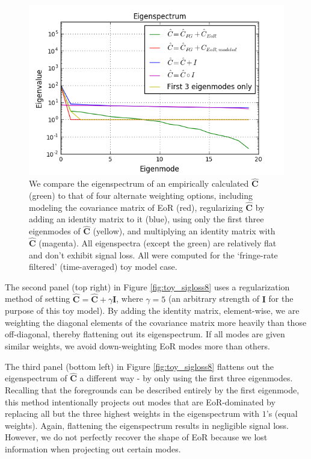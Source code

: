 \documentclass[preprint2,numberedappendix,tighten]{aastex6}  %
\begin{document}
\begin{figure}
	\centering
	\includegraphics[trim={0.3cm 0cm 0.3cm 0.3cm},clip,width=\columnwidth]{plots/toy_sigloss14.png}
	\caption{We compare the eigenspectrum of an empirically calculated $\hat{\textbf{C}}$ (green) to that of four alternate 
weighting options, including modeling the covariance matrix of EoR (red), regularizing $\hat{\textbf{C}}$ by adding an identity 
matrix to it (blue), using only the first three eigenmodes of $\hat{\textbf{C}}$ (yellow), and multiplying an identity matrix with $
\hat{\textbf{C}}$ (magenta). All eigenspectra (except the green) are relatively flat and don't exhibit signal loss. All were 
computed for the `fringe-rate filtered' (time-averaged) toy model case.}
	\label{fig:toy_sigloss14}
\end{figure}

The second panel (top right) in Figure \ref{fig:toy_sigloss8} uses a regularization method of setting $\hat{\textbf{C}} = 
\hat{\textbf{C}} + \gamma\textbf{I}$, where $\gamma = 5$ (an arbitrary strength 
of $\textbf{I}$ for the purpose of this toy model). By adding the identity matrix, element-wise, we are weighting the diagonal 
elements of the covariance matrix more heavily than those off-diagonal, thereby flattening out its eigenspectrum. If all modes are given 
similar weights, we avoid down-weighting EoR modes more than others.  

The third panel (bottom left) in Figure \ref{fig:toy_sigloss8} flattens out the eigenspectrum of $\hat{\textbf{C}}$ a different way - 
by only using the first three eigenmodes. Recalling that the foregrounds can be described entirely by the first eigenmode, this 
method intentionally projects out modes that are EoR-dominated by replacing all but the three highest weights in the 
eigenspectrum with $1$'s (equal weights). Again, flattening the eigenspectrum results in negligible signal loss. However, we do 
not perfectly recover the shape of EoR because we lost information when projecting out certain modes. 
\end{document}
